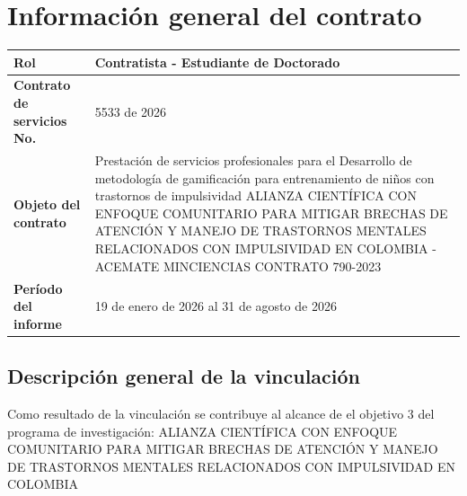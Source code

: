 \documentclass[10pt, spanish]{article}
\begin{document}

\tableofcontents
\newpage

\section{Información general del contrato}
\begin{table}[H]
    \centering
    \begin{tabular}{>{\raggedright\arraybackslash}m{8cm} >{\raggedright\arraybackslash}m{6.5cm}}
        \toprule
        \textbf{Rol} & \vspace{2mm}Contratista - Estudiante de Doctorado\vspace{2mm} \\\hline
        \vspace{2mm}
        \textbf{Contrato de servicios No.}\vspace{2mm} & \vspace{2mm}5533 de 2026\vspace{2mm} \\\hline
        \vspace{2mm}
        \textbf{Objeto del contrato}\vspace{2mm} & \vspace{2mm}
        Prestación de servicios profesionales para el Desarrollo de metodología de gamificación
        para entrenamiento de niños con trastornos de impulsividad ALIANZA CIENTÍFICA CON
        ENFOQUE COMUNITARIO PARA MITIGAR BRECHAS DE ATENCIÓN Y MANEJO DE TRASTORNOS
        MENTALES RELACIONADOS CON IMPULSIVIDAD EN COLOMBIA - ACEMATE MINCIENCIAS
        CONTRATO 790-2023\vspace{2mm} \\\hline
        \textbf{Período del informe} & \vspace{2mm}19 de enero de 2026 al 31 de agosto de 2026\vspace{2mm} \\\hline
    \end{tabular}
\end{table}

\subsection{Descripción general de la vinculación}
Como resultado de la vinculación se contribuye al alcance de el objetivo 3 del programa de investigación: ALIANZA CIENTÍFICA CON ENFOQUE COMUNITARIO PARA MITIGAR BRECHAS DE ATENCIÓN Y MANEJO DE TRASTORNOS MENTALES RELACIONADOS CON IMPULSIVIDAD EN COLOMBIA
\end{document}
